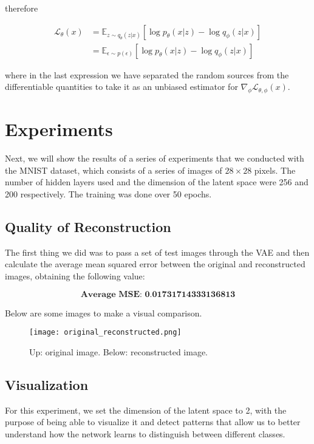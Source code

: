 \documentclass[twocolumn, 9pt]{article}
\begin{document}
therefore

\begin{align*}
\mathcal{L}_{\theta}(x) &= \mathbb{E}_{z \sim q_{\theta}(z|x)} [\log p_{\theta}(x|z) - \log q_{\phi}(z|x)] \\
&= \mathbb{E}_{\epsilon \sim p(\epsilon)} [\log p_{\theta}(x|z) - \log q_{\phi}(z|x)]
\end{align*}

where in the last expression we have separated the random sources from the differentiable quantities to take it as an unbiased estimator for $\nabla_{\phi} \mathcal{L}_{\theta, \phi}(x)$.

\section{Experiments}

Next, we will show the results of a series of experiments that we conducted with the MNIST dataset, which consists of a series of images of $28\times28$ pixels. The number of hidden layers used and the dimension of the latent space were 256 and 200 respectively. The training was done over 50 epochs.

\subsection{Quality of Reconstruction}

The first thing we did was to pass a set of test images through the VAE and then calculate the average mean squared error between the original and reconstructed images, obtaining the following value:

$$
\textbf{Average MSE:   0.01731714333136813}
$$

Below are some images to make a visual comparison.

\begin{figure}[ht]
\centering
\texttt{[image: original\_reconstructed.png]}
\caption{Up: original image. Below: reconstructed image.}
\label{fig:example}
\end{figure}

\subsection{Visualization}

For this experiment, we set the dimension of the latent space to 2, with the purpose of being able to visualize it and detect patterns that allow us to better understand how the network learns to distinguish between different classes.
\end{document}
